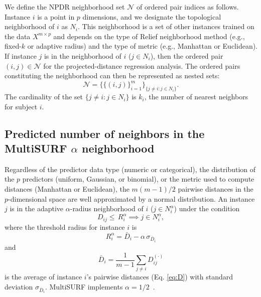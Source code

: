 \documentclass[10pt,letterpaper]{article}\usepackage[]{graphicx}\usepackage[]{color}
\begin{document}
We define the NPDR neighborhood set $\mathcal{N}$ of ordered pair indices as follows. Instance $i$ is a point in $p$ dimensions, and we designate the topological neighborhood of $i$ as $N_{i}$. This neighborhood is a set of other instances trained on the data $X^{m \times p}$ and depends on the type of Relief neighborhood method (e.g., fixed-$k$ or adaptive radius) and the type of metric (e.g., Manhattan or Euclidean). If instance $j$ is in the neighborhood of $i$ ($j \in N_{i}$), then the ordered pair $(i,j) \in \mathcal{N}$ for the projected-distance regression analysis. The ordered pairs constituting the neighborhood can then be represented as nested sets:
\begin{equation}\label{eq:N}
\mathcal{N}=\{\{(i, j)\}_{i=1}^{m}\}_{\{j \ne i : j \in N_{i}\}}.
\end{equation}
The cardinality of the set $\{j \ne i : j \in N_{i}\}$ is $k_i$, the number of nearest neighbors for subject $i$. 

\subsection{Predicted number of neighbors in the MultiSURF \texorpdfstring{$\alpha$}{} neighborhood}

Regardless of the predictor data type (numeric or categorical), the distribution of the $p$ predictors (uniform, Gaussian, or binomial), or the metric used to compute distances (Manhattan or Euclidean), the $m(m-1)/2$ pairwise distances in the $p$-dimensional space are well approximated by a normal distribution. An instance $j$ is in the adaptive $\alpha$-radius neighborhood of $i$ ($j \in N^{\alpha}_{i}$) under the condition
%
%
\begin{equation}
D_{ij} \le \, R_i^{\alpha} \implies j \in N^{\alpha}_{i},
\end{equation}
where the threshold radius for instance $i$ is
\begin{equation}
R_i^{\alpha} =  \bar{D}_i - \alpha \, \sigma_{\bar{D}_i}
\end{equation}
and
\begin{equation}
\bar{D}_i = \frac{1}{m-1} \sum_{j \ne i} D^{(\cdot)}_{ij}
\end{equation}
is the average of instance $i$'s pairwise distances (Eq. \ref{eq:D}) with standard deviation $\sigma_{\bar{D}_i}$. MultiSURF implements $\alpha=1/2$~\cite{urbanowicz17}.
\end{document}
